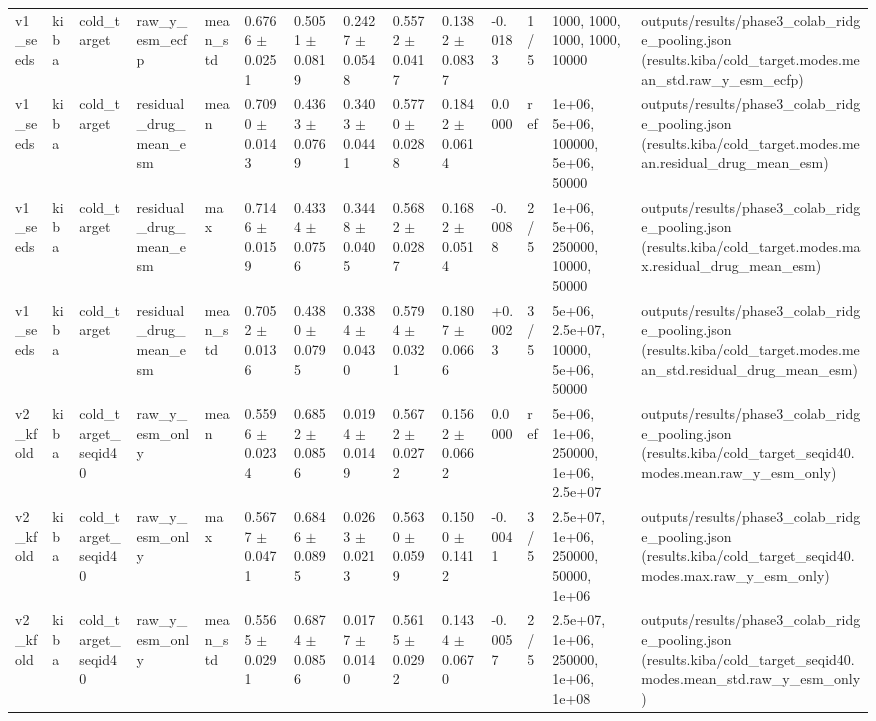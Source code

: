 \begin{table}[htbp]
\begin{tabular}{llllllllllllll}
v1\_seeds & kiba & cold\_target & raw\_y\_esm\_ecfp & mean\_std & 0.6766 $\pm$ 0.0251 & 0.5051 $\pm$ 0.0819 & 0.2427 $\pm$ 0.0548 & 0.5572 $\pm$ 0.0417 & 0.1382 $\pm$ 0.0837 & -0.0183 & 1/5 & 1000, 1000, 1000, 1000, 10000 & outputs/results/phase3\_colab\_ridge\_pooling.json (results.kiba/cold\_target.modes.mean\_std.raw\_y\_esm\_ecfp) \\
v1\_seeds & kiba & cold\_target & residual\_drug\_mean\_esm & mean & 0.7090 $\pm$ 0.0143 & 0.4363 $\pm$ 0.0769 & 0.3403 $\pm$ 0.0441 & 0.5770 $\pm$ 0.0288 & 0.1842 $\pm$ 0.0614 & 0.0000 & ref & 1e+06, 5e+06, 100000, 5e+06, 50000 & outputs/results/phase3\_colab\_ridge\_pooling.json (results.kiba/cold\_target.modes.mean.residual\_drug\_mean\_esm) \\
v1\_seeds & kiba & cold\_target & residual\_drug\_mean\_esm & max & 0.7146 $\pm$ 0.0159 & 0.4334 $\pm$ 0.0756 & 0.3448 $\pm$ 0.0405 & 0.5682 $\pm$ 0.0287 & 0.1682 $\pm$ 0.0514 & -0.0088 & 2/5 & 1e+06, 5e+06, 250000, 10000, 50000 & outputs/results/phase3\_colab\_ridge\_pooling.json (results.kiba/cold\_target.modes.max.residual\_drug\_mean\_esm) \\
v1\_seeds & kiba & cold\_target & residual\_drug\_mean\_esm & mean\_std & 0.7052 $\pm$ 0.0136 & 0.4380 $\pm$ 0.0795 & 0.3384 $\pm$ 0.0430 & 0.5794 $\pm$ 0.0321 & 0.1807 $\pm$ 0.0666 & +0.0023 & 3/5 & 5e+06, 2.5e+07, 10000, 5e+06, 50000 & outputs/results/phase3\_colab\_ridge\_pooling.json (results.kiba/cold\_target.modes.mean\_std.residual\_drug\_mean\_esm) \\
v2\_kfold & kiba & cold\_target\_seqid40 & raw\_y\_esm\_only & mean & 0.5596 $\pm$ 0.0234 & 0.6852 $\pm$ 0.0856 & 0.0194 $\pm$ 0.0149 & 0.5672 $\pm$ 0.0272 & 0.1562 $\pm$ 0.0662 & 0.0000 & ref & 5e+06, 1e+06, 250000, 1e+06, 2.5e+07 & outputs/results/phase3\_colab\_ridge\_pooling.json (results.kiba/cold\_target\_seqid40.modes.mean.raw\_y\_esm\_only) \\
v2\_kfold & kiba & cold\_target\_seqid40 & raw\_y\_esm\_only & max & 0.5677 $\pm$ 0.0471 & 0.6846 $\pm$ 0.0895 & 0.0263 $\pm$ 0.0213 & 0.5630 $\pm$ 0.0599 & 0.1500 $\pm$ 0.1412 & -0.0041 & 3/5 & 2.5e+07, 1e+06, 250000, 50000, 1e+06 & outputs/results/phase3\_colab\_ridge\_pooling.json (results.kiba/cold\_target\_seqid40.modes.max.raw\_y\_esm\_only) \\
v2\_kfold & kiba & cold\_target\_seqid40 & raw\_y\_esm\_only & mean\_std & 0.5565 $\pm$ 0.0291 & 0.6874 $\pm$ 0.0856 & 0.0177 $\pm$ 0.0140 & 0.5615 $\pm$ 0.0292 & 0.1434 $\pm$ 0.0670 & -0.0057 & 2/5 & 2.5e+07, 1e+06, 250000, 1e+06, 1e+08 & outputs/results/phase3\_colab\_ridge\_pooling.json (results.kiba/cold\_target\_seqid40.modes.mean\_std.raw\_y\_esm\_only) \\

\end{tabular}
\end{table}
